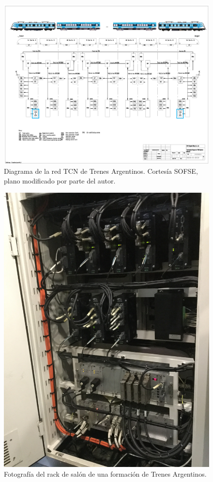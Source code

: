 \begin{figure}[ht]
	\centering
	\includegraphics[width=1\textwidth]{./Figures/diagramaTrenesArgentinosTCN.png}
	\caption{Diagrama de la red TCN de Trenes Argentinos. Cortesía SOFSE, plano modificado por parte del autor.}
	\label{fig:sofseTCN}
\end{figure}


\begin{figure}[ht]
	\centering
	\includegraphics[width=1\textwidth , angle=90]{./Figures/imgRackTCN.JPG}
	\caption{Fotografía del rack de salón de una formación de Trenes Argentinos.}
	\label{fig:imgRackTCN}
\end{figure}



